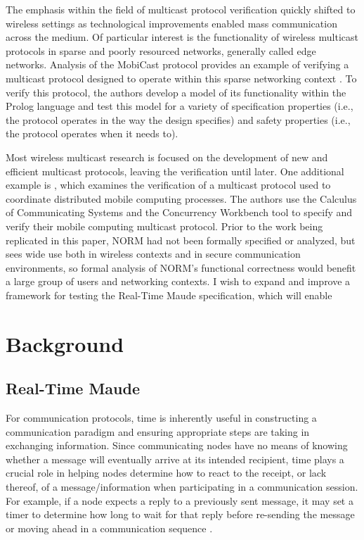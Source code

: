 \documentclass[10pt, journal]{IEEEtran}
\begin{document}
The emphasis within the field of multicast protocol verification quickly shifted to wireless settings as technological improvements enabled mass communication across the medium. Of particular interest is the functionality of wireless multicast protocols in sparse and poorly resourced networks, generally called edge networks. Analysis of the MobiCast protocol provides an example of verifying a multicast protocol designed to operate within this sparse networking context \cite{Tan2000}. To verify this protocol, the authors develop a model of its functionality within the Prolog language and test this model for a variety of specification properties (i.e., the protocol operates in the way the design specifies) and safety properties (i.e., the protocol operates when it needs to). 

Most wireless multicast research is focused on the development of new and efficient multicast protocols, leaving the verification until later. One additional example is \cite{Anastasi2000}, which examines the verification of a multicast protocol used to coordinate distributed mobile computing processes. The authors use the Calculus of Communicating Systems \cite{Milner1989} and the Concurrency Workbench tool \cite{Cleaveland1996} to specify and verify their mobile computing multicast protocol. Prior to the work being replicated in this paper, NORM had not been formally specified or analyzed, but sees wide use both in wireless contexts and in secure communication environments, so formal analysis of NORM's functional correctness would benefit a large group of users and networking contexts. I wish to expand and improve a framework for testing the Real-Time Maude specification, which will enable

\section{Background}

\subsection{Real-Time Maude}

For communication protocols, time is inherently useful in constructing a communication paradigm and ensuring appropriate steps are taking in exchanging information. Since communicating nodes have no means of knowing whether a message will eventually arrive at its intended recipient, time plays a crucial role in helping nodes determine how to react to the receipt, or lack thereof, of a message/information when participating in a communication session. For example, if a node expects a reply to a previously sent message, it may set a timer to determine how long to wait for that reply before re-sending the message or moving ahead in a communication sequence \cite{Lien2004}.
\end{document}
